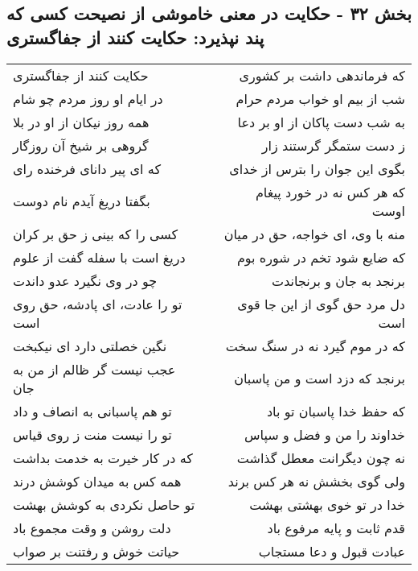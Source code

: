 \begin{center}
\section*{بخش ۳۲ - حکایت در معنی خاموشی از نصیحت کسی که پند نپذیرد: حکایت کنند از جفاگستری}
\label{sec:032}
\begin{longtable}{l p{0.5cm} r}
حکایت کنند از جفاگستری
&&
که فرماندهی داشت بر کشوری
\\
در ایام او روز مردم چو شام
&&
شب از بیم او خواب مردم حرام
\\
همه روز نیکان از او در بلا
&&
به شب دست پاکان از او بر دعا
\\
گروهی بر شیخ آن روزگار
&&
ز دست ستمگر گرستند زار
\\
که ای پیر دانای فرخنده رای
&&
بگوی این جوان را بترس از خدای
\\
بگفتا دریغ آیدم نام دوست
&&
که هر کس نه در خورد پیغام اوست
\\
کسی را که بینی ز حق بر کران
&&
منه با وی، ای خواجه، حق در میان
\\
دریغ است با سفله گفت از علوم
&&
که ضایع شود تخم در شوره بوم
\\
چو در وی نگیرد عدو داندت
&&
برنجد به جان و برنجاندت
\\
تو را عادت، ای پادشه، حق روی است
&&
دل مرد حق گوی از این جا قوی است
\\
نگین خصلتی دارد ای نیکبخت
&&
که در موم گیرد نه در سنگ سخت
\\
عجب نیست گر ظالم از من به جان
&&
برنجد که دزد است و من پاسبان
\\
تو هم پاسبانی به انصاف و داد
&&
که حفظ خدا پاسبان تو باد
\\
تو را نیست منت ز روی قیاس
&&
خداوند را من و فضل و سپاس
\\
که در کار خیرت به خدمت بداشت
&&
نه چون دیگرانت معطل گذاشت
\\
همه کس به میدان کوشش درند
&&
ولی گوی بخشش نه هر کس برند
\\
تو حاصل نکردی به کوشش بهشت
&&
خدا در تو خوی بهشتی بهشت
\\
دلت روشن و وقت مجموع باد
&&
قدم ثابت و پایه مرفوع باد
\\
حیاتت خوش و رفتنت بر صواب
&&
عبادت قبول و دعا مستجاب
\\
\end{longtable}
\end{center}

